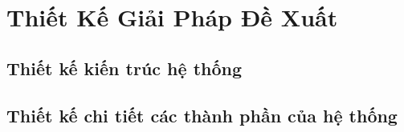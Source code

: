 \chapter{Thiết Kế Giải Pháp Đề Xuất}
\section{Thiết kế kiến trúc hệ thống}

\newpage
\section{Thiết kế chi tiết các thành phần của hệ thống}


